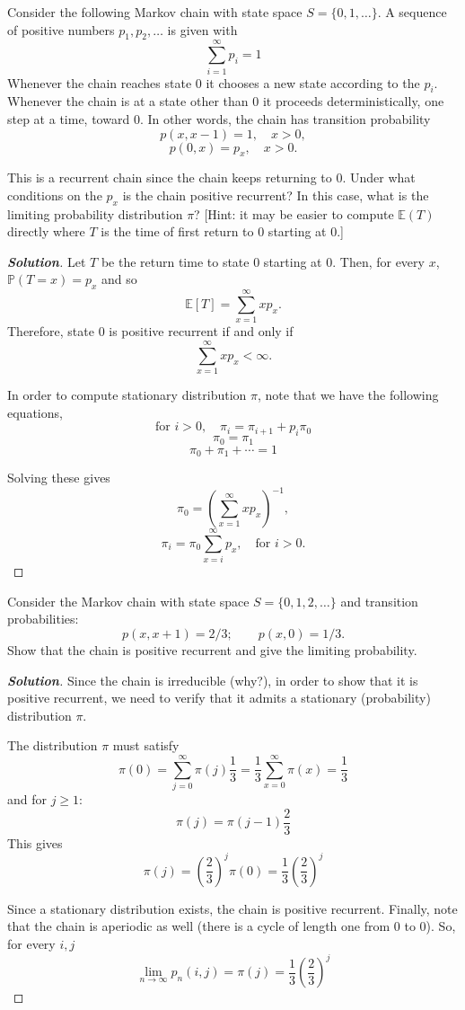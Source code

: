 \documentclass[12pt]{book}
\newenvironment{problem}[2][Problem]{\begin{trivlist}
\item[\hskip \labelsep {\bfseries #1}\hskip \labelsep {\bfseries #2.}]}{\end{trivlist}}
\newenvironment{solution}
               {\let\oldqedsymbol=\qedsymbol
                \renewcommand{\qedsymbol}{$\square$}
                \begin{proof}[\bfseries\upshape Solution]}
               {\end{proof}
                \renewcommand{\qedsymbol}{\oldqedsymbol}}
\begin{document}
\begin{problem}{2.2}
Consider the following Markov chain with state space $S = \{0, 1, \ldots\}$. A sequence of positive numbers $p_1, p_2, \ldots$ is given with
\[
\sum_{i=1}^{\infty} p_i = 1
\]
Whenever the chain reaches state $0$ it chooses a new state according to the $p_i$. Whenever the chain is at a state other than $0$ it proceeds deterministically, one step at a time, toward $0$. In other words, the chain has transition probability
\[
p(x, x-1) = 1, \quad x > 0,
\]
\[
p(0, x) = p_x, \quad x > 0.
\]

This is a recurrent chain since the chain keeps returning to $0$. Under what conditions on the $p_x$ is the chain positive recurrent? In this case, what is the limiting probability distribution $\pi$? [Hint: it may be easier to compute $\mathbb{E}(T)$ directly where $T$ is the time of first return to $0$ starting at $0$.]
\end{problem}
\begin{solution}
Let $T$ be the return time to state $0$ starting at $0$. Then, for every $x$, $\mathbb{P}(T = x) = p_x$ and so
\[
\mathbb{E}[T] = \sum_{x=1}^{\infty} x p_x.
\]
Therefore, state $0$ is positive recurrent if and only if
\[
\sum_{x=1}^{\infty} x p_x < \infty.
\]

In order to compute stationary distribution $\pi$, note that we have the following equations,
\[
\text{for } i > 0, \quad \pi_i = \pi_{i+1} + p_i \pi_0
\]
\[
\pi_0 = \pi_1
\]
\[
\pi_0 + \pi_1 + \cdots = 1
\]

Solving these gives
\[
\pi_0 = \left( \sum_{x=1}^{\infty} x p_x \right)^{-1},
\]
\[
\pi_i = \pi_0 \sum_{x=i}^{\infty} p_x, \quad \text{for } i > 0.
\]
\end{solution}

\begin{problem}{2.3}
Consider the Markov chain with state space $S = \{0, 1, 2, \ldots\}$ and transition probabilities:
\[
p(x, x+1) = 2/3; \qquad p(x, 0) = 1/3.
\]
Show that the chain is positive recurrent and give the limiting probability.
\end{problem}
\begin{solution}
Since the chain is irreducible (why?), in order to show that it is positive recurrent, we need to verify that it admits a stationary (probability) distribution $\pi$.

The distribution $\pi$ must satisfy
\[
\pi(0) = \sum_{j=0}^{\infty} \pi(j) \frac{1}{3} = \frac{1}{3} \sum_{x=0}^{\infty} \pi(x) = \frac{1}{3}
\]
and for $j \geq 1$:
\[
\pi(j) = \pi(j-1) \frac{2}{3}
\]
This gives
\[
\pi(j) = \left(\frac{2}{3}\right)^j \pi(0) = \frac{1}{3} \left(\frac{2}{3}\right)^j
\]

Since a stationary distribution exists, the chain is positive recurrent. Finally, note that the chain is aperiodic as well (there is a cycle of length one from $0$ to $0$). So, for every $i, j$
\[
\lim_{n \to \infty} p_n(i, j) = \pi(j) = \frac{1}{3} \left(\frac{2}{3}\right)^j
\]
\end{solution}
\end{document}
